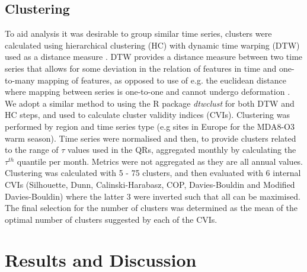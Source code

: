 \documentclass[journal abbreviation, manuscript]{copernicus}
\begin{document}
\subsection{Clustering} \label{sect:method_clustering}
To aid analysis it was desirable to group similar time series, clusters were calculated using hierarchical clustering (HC) with dynamic time warping (DTW) used as a distance measure \citep{AGHABOZORGI201516}. DTW provides a distance measure between two time series that allows for some deviation in the relation of features in time and one-to-many mapping of features, as opposed to use of e.g. the euclidean distance where mapping between series is one-to-one and cannot undergo deformation \citep{Berndt_dtw, Abdullah_Keogh_dtw}. We adopt a similar method to \cite{REED2025110686} using the R package \emph{dtwclust} \citep{dtwclust} for both DTW and HC steps, and used to calculate cluster validity indices (CVIs). Clustering was performed by region and time series type (e.g sites in Europe for the MDA8-O3 warm season). Time series were normalised and then, to provide clusters related to the range of $\tau$ values used in the QRs, aggregated monthly by calculating the $\tau^{th}$ quantile per month. Metrics were not aggregated as they are all annual values. Clustering was calculated with 5 - 75 clusters, and then evaluated with 6 internal CVIs (Silhouette, Dunn, Calinski-Harabasz, COP, Davies-Bouldin and Modified Davies-Bouldin) where the latter 3 were inverted such that all can be maximised. The final selection for the number of clusters was determined as the mean of the optimal number of clusters suggested by each of the CVIs. 

\clearpage
\section{Results and Discussion}
\end{document}
